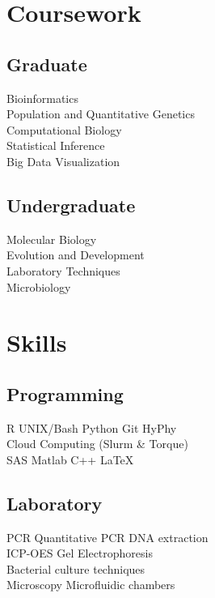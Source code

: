 \documentclass[]{deedy-resume-openfont}
\begin{document}
\begin{minipage}[t]{0.32\textwidth}

\section{Coursework}
\subsection{Graduate}
Bioinformatics \\
Population and Quantitative Genetics \\
Computational Biology \\
Statistical Inference \\
Big Data Visualization \\
\sectionsep

\subsection{Undergraduate}
Molecular Biology \\
Evolution and Development \\
Laboratory Techniques \\
Microbiology \\
\sectionsep


\section{Skills}
\subsection{Programming}
R \textbullet{}   UNIX/Bash \textbullet{} Python \textbullet{} Git \textbullet{} HyPhy\\
 Cloud Computing (Slurm \& Torque) \\
SAS \textbullet{} Matlab \textbullet{} C++ \textbullet{}  \LaTeX\ \\
\sectionsep

\subsection{Laboratory}
PCR \textbullet{} Quantitative PCR \textbullet{} DNA extraction \\
ICP-OES \textbullet{} Gel Electrophoresis \\
Bacterial culture techniques \\
Microscopy \textbullet{} Microfluidic chambers \\


\end{minipage}
\end{document}
